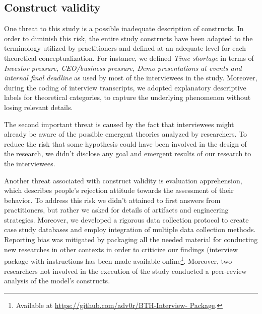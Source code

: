 \documentclass[10pt,journal,letterpaper,compsoc]{IEEEtran}
\begin{document}
\subsection{Construct validity} %
One threat to this study is a possible inadequate description of constructs. In 
order to diminish this risk, the entire study constructs have been adapted to 
the terminology utilized by practitioners and defined at an adequate level for 
each theoretical conceptualization. For instance, we defined \textit{Time 
shortage} in terms of \textit{Investor pressure, CEO/business pressure, Demo 
presentations at events and internal final deadline} as used by most of the 
interviewees in the study.
Moreover, during the coding of interview transcripts, we adopted explanatory
descriptive labels for theoretical categories, to capture the underlying
phenomenon without losing relevant details.

The second important threat is caused by the fact that interviewees might 
already be aware of the possible emergent theories analyzed by researchers. To 
reduce the risk that some hypothesis could have been involved in the design of 
the research, we didn't disclose any goal and emergent results of our research 
to the interviewees.

Another threat associated with construct validity is evaluation apprehension,
which describes people's rejection attitude towards the assessment of their
behavior. To address this risk we didn't attained to first answers from
practitioners, but rather we asked for details of artifacts and engineering
strategies. %
Moreover, we developed a rigorous data collection protocol to create case study 
databases and employ integration of multiple data collection methods.%
Reporting bias was mitigated by packaging all the needed material for
conducting new researches in other contexts in order to criticize our findings
(interview package with instructions has been made available
online\footnote{Available at \url{https://github.com/adv0r/BTH-Interview-
Package}.}. %
Moreover, two researchers not involved in the execution of the study
conducted a peer-review analysis of the model's constructs.
\end{document}
